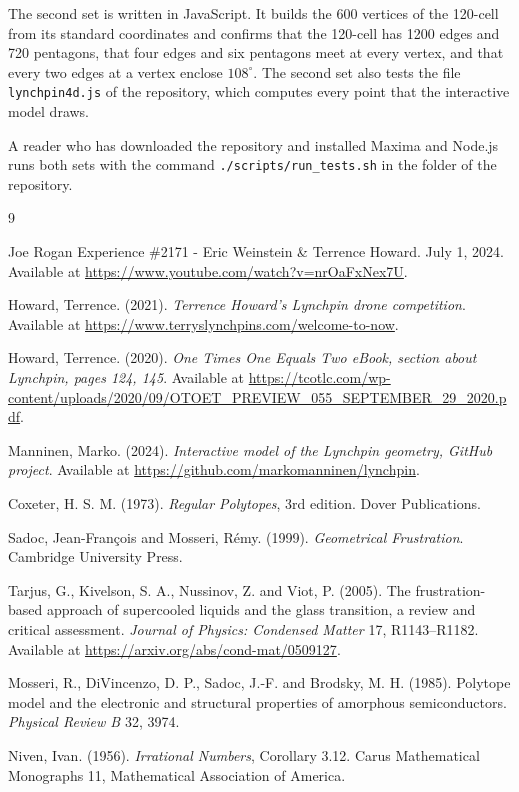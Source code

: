 \documentclass[a4paper,12pt]{article}
\begin{document}
The second set is written in JavaScript. It builds the 600 vertices of the 120-cell from its standard coordinates and confirms that the 120-cell has 1200 edges and 720 pentagons, that four edges and six pentagons meet at every vertex, and that every two edges at a vertex enclose \( 108^\circ \). The second set also tests the file \texttt{lynchpin4d.js} of the repository, which computes every point that the interactive model draws.

A reader who has downloaded the repository and installed Maxima and Node.js runs both sets with the command \texttt{./scripts/run\_tests.sh} in the folder of the repository.


\begin{thebibliography}{9}

Joe Rogan Experience \#2171 - Eric Weinstein \& Terrence Howard. July 1, 2024. Available at \url{https://www.youtube.com/watch?v=nrOaFxNex7U}.

Howard, Terrence. (2021). \emph{Terrence Howard's Lynchpin drone competition}. Available at \url{https://www.terryslynchpins.com/welcome-to-now}.

Howard, Terrence. (2020). \emph{One Times One Equals Two eBook, section about Lynchpin, pages 124, 145}. Available at \url{https://tcotlc.com/wp-content/uploads/2020/09/OTOET_PREVIEW_055_SEPTEMBER_29_2020.pdf}.

Manninen, Marko. (2024). \emph{Interactive model of the Lynchpin geometry, GitHub project}. Available at \url{https://github.com/markomanninen/lynchpin}.

Coxeter, H. S. M. (1973). \emph{Regular Polytopes}, 3rd edition. Dover Publications.

Sadoc, Jean-Fran\c{c}ois and Mosseri, R\'emy. (1999). \emph{Geometrical Frustration}. Cambridge University Press.

Tarjus, G., Kivelson, S. A., Nussinov, Z. and Viot, P. (2005). The frustration-based approach of supercooled liquids and the glass transition, a review and critical assessment. \emph{Journal of Physics: Condensed Matter} 17, R1143--R1182. Available at \url{https://arxiv.org/abs/cond-mat/0509127}.

Mosseri, R., DiVincenzo, D. P., Sadoc, J.-F. and Brodsky, M. H. (1985). Polytope model and the electronic and structural properties of amorphous semiconductors. \emph{Physical Review B} 32, 3974.

Niven, Ivan. (1956). \emph{Irrational Numbers}, Corollary 3.12. Carus Mathematical Monographs 11, Mathematical Association of America.

\end{thebibliography}
\end{document}
